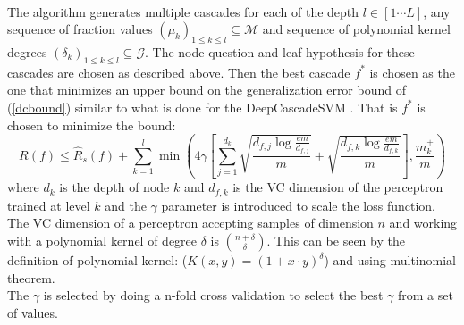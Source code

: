 \documentclass[paper=letter, fontsize=11pt]{scrartcl}
\numberwithin{equation}{section}		%
\numberwithin{figure}{section}			%
\numberwithin{table}{section}				%
\begin{document}
\\The algorithm generates multiple cascades for each of the depth $l \in [1 \cdots L]$, any sequence of fraction values $(\mu_k)_{1 \leq k \leq l} \subseteq \mathcal{M}$ and sequence of polynomial kernel degrees $(\delta_k)_{1 \leq k \leq l} \subseteq \mathcal{G}$. The node question and leaf hypothesis for these cascades are chosen as described above. Then the best cascade $f^*$ is chosen as the one that minimizes an upper bound on the generalization error bound of (\ref{dcbound}) similar to what is done for the DeepCascadeSVM \cite{deepcascades}. That is $f^*$ is chosen to minimize the bound:
\begin{equation}
R(f) \leq \widehat{R}_s(f) + \sum_{k=1}^{l} \min \left( 4\gamma \left[ \sum_{j=1}^{d_k} \sqrt{\frac{d_{f,j} \log\frac{em}{d_{f,j}}}{m}} + \sqrt{\frac{d_{f,k} \log\frac{em}{d_{f,k}}}{m}} \right] , \frac{m_k^+}{m} \right)
\label{dcvcbound}
\end{equation}
where $d_k$ is the depth of node $k$ and $d_{f,k}$ is the VC dimension of the perceptron trained at level $k$ and the $\gamma$ parameter is introduced to scale the loss function. %
\\The VC dimension of a perceptron accepting samples of dimension $n$ and working with a polynomial kernel of degree $\delta$ is $\binom{n+\delta}{\delta}$. This can be seen by the definition of polynomial kernel: ($K(x,y) = (1+x \cdot y)^\delta$) and using multinomial theorem.
\\The $\gamma$ is selected by doing a n-fold cross validation to select the best $\gamma$ from a set of values.
\end{document}
